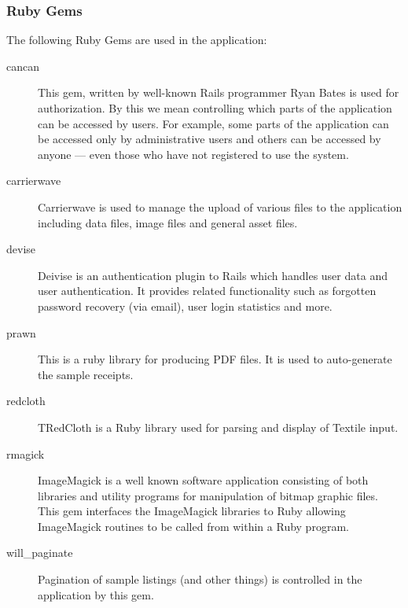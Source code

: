 \documentclass[12pt,twoside]{article}
\begin{document}
\subsubsection{Ruby Gems}
The following Ruby Gems are used in the application:
\begin{description}
\item[cancan\cite{cancan}]
This gem, written by well-known Rails programmer Ryan Bates is used for
authorization. By this we mean controlling which parts of the application
can be accessed by users. For example, some parts of the application can
be accessed only by administrative users and others can be accessed by
anyone --- even those who have not registered to use the system.
\item[carrierwave\cite{carrierwave}]
Carrierwave is used to manage the upload of various files to the application
including data files, image files and general asset files.
\item[devise\cite{devise}]
Deivise is an authentication plugin to Rails which handles user data and
user authentication. It provides related functionality such as forgotten
password recovery (via email), user login statistics and more.
\item[prawn\cite{prawn}]
This is a ruby library for producing PDF files. It is used to
auto-generate the sample receipts.
\item[redcloth\cite{redcloth}]
TRedCloth is a Ruby library used for parsing and display of Textile input.
\item[rmagick\cite{rmagick}]
ImageMagick is a well known software application consisting of both
libraries and utility programs for manipulation of bitmap graphic files.
This gem interfaces the ImageMagick libraries to Ruby allowing
ImageMagick routines to be called from within a Ruby program.
\item[will\_paginate\cite{willp}]
Pagination of sample listings (and other things) is controlled in the
application by this gem.
\end{description}
\end{document}
